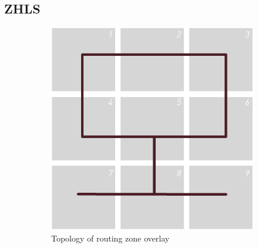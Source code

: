 \documentclass[a4paper,10pt]{scrartcl}
\begin{document}
\subsection{\gls{ZHLS}}
\label{subsec:zhls}
\begin{figure}
        \centering
        \begin{subfigure}[b]{0.35\textwidth}
                \includegraphics[width=\textwidth]{../images/ZHLS_overlay}
                \caption{Topology of routing zone overlay}
                \label{fig:zhls_overlay}
        \end{subfigure}
        ~ %
        \begin{subfigure}[b]{0.35\textwidth}

\end{subfigure}
\end{figure}
\end{document}

